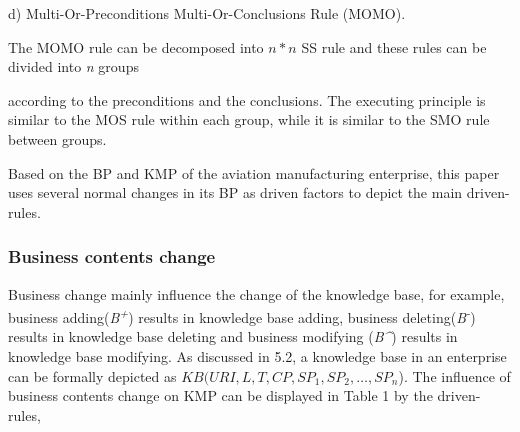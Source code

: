 \documentclass{elsarticle}
\begin{document}
d) Multi-Or-Preconditions Multi-Or-Conclusions Rule (MOMO).


\textrm{The MOMO rule can be decomposed into
}$n*n$\textrm{ SS rule and these rules can be divided
into}\textrm{\textit{ n}}\textrm{ groups}


\textrm{according to the preconditions and the conclusions. The
executing principle is similar to the MOS rule within each group, while
it is similar to the SMO rule between groups.}


\textrm{Based on the BP and KMP of the aviation manufacturing
enterprise, this paper uses several normal changes in its BP as driven
factors to depict the main driven-rules.}


\subsubsection{ Business contents change}
\label{sec:busin-cont-change}




\textrm{Business change mainly influence the change of the knowledge
base, for example, business
adding(}\textrm{\textit{B}}\textrm{\textit{\textsuperscript{+}}}\textrm{)}\textrm{\textit{
}}\textrm{results in knowledge base adding, business
deleting(}\textrm{\textit{B}}\textrm{\textit{\textsuperscript{{}-}}}\textrm{)}\textrm{\textit{
}}\textrm{results in knowledge base deleting and business modifying
(}\textrm{\textit{B\^{}}}\textrm{)}\textrm{\textit{ }}\textrm{results
in knowledge base modifying. As discussed in 5.2, a knowledge base in
an enterprise can be formally depicted as}
$KB(URI, L, T, CP, SP_1, SP_2,\ldots,SP_n$). The influence of business contents change on KMP can
be displayed in Table 1 by the driven-rules,
\end{document}

